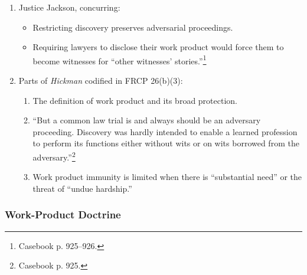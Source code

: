 \begin{enumerate}
\begin{itemize}
    \end{itemize}
    \item Justice Jackson, concurring:
    \begin{itemize}
        \item Restricting discovery preserves adversarial proceedings.
        \item Requiring lawyers to disclose their work product would force 
        them to become witnesses for ``other witnesses' 
        stories.''\footnote{Casebook p. 925--926.}
    \end{itemize}
    \item Parts of \emph{Hickman} codified in FRCP 26(b)(3):
    \begin{enumerate}
        \item The definition of work product and its broad protection.
        \item ``But a common law trial is and always should be an adversary 
        proceeding. Discovery was hardly intended to enable a learned 
        profession to perform its functions either without wits or on wits 
        borrowed from the adversary.''\footnote{Casebook p. 925.}
        \item Work product immunity is limited when there is ``substantial 
        need'' or the threat of ``undue hardship.''
    \end{enumerate}
\end{enumerate}

\subsubsection{Work-Product Doctrine}

